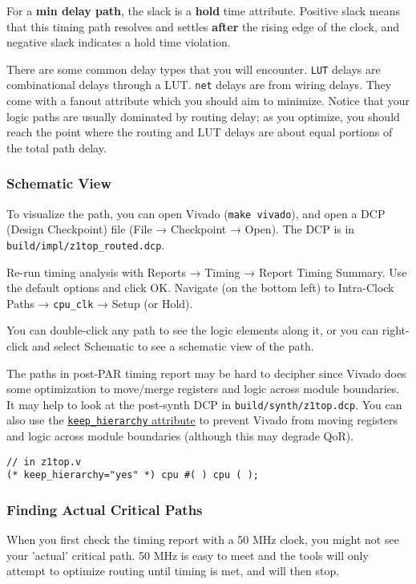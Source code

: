 For a \textbf{min delay path}, the slack is a \textbf{hold} time attribute.
Positive slack means that this timing path resolves and settles \textbf{after} the rising edge of the clock, and negative slack indicates a hold time violation.

There are some common delay types that you will encounter.
\verb|LUT| delays are combinational delays through a LUT.
\verb|net| delays are from wiring delays. They come with a fanout attribute which you should aim to minimize.
Notice that your logic paths are usually dominated by routing delay; as you optimize, you should reach the point where the routing and LUT delays are about equal portions of the total path delay.

\subsubsection{Schematic View}
To visualize the path, you can open Vivado (\verb|make vivado|), and open a DCP (Design Checkpoint) file (File → Checkpoint → Open). The DCP is in \verb|build/impl/z1top_routed.dcp|.

Re-run timing analysis with Reports → Timing → Report Timing Summary. Use the default options and click OK. Navigate (on the bottom left) to Intra-Clock Paths → \verb|cpu_clk| → Setup (or Hold).

You can double-click any path to see the logic elements along it, or you can right-click and select Schematic to see a schematic view of the path.

The paths in post-PAR timing report may be hard to decipher since Vivado does some optimization to move/merge registers and logic across module boundaries. It may help to look at the post-synth DCP in \verb|build/synth/z1top.dcp|. You can also use the \href{https://www.xilinx.com/support/answers/54778.html}{\texttt{keep\_hierarchy} attribute} to prevent Vivado from moving registers and logic across module boundaries (although this may degrade QoR).

\begin{verbatim}
// in z1top.v
(* keep_hierarchy="yes" *) cpu #( ) cpu ( );
\end{verbatim}

\subsubsection{Finding Actual Critical Paths}
When you first check the timing report with a 50 MHz clock, you might not see your 'actual' critical path.
50 MHz is easy to meet and the tools will only attempt to optimize routing until timing is met, and will then stop.


